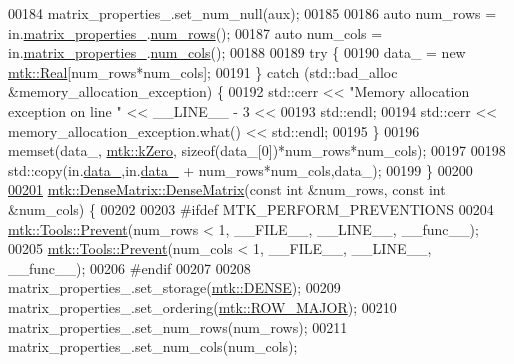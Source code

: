 \begin{DoxyCode}
00184   matrix\_properties\_.set\_num\_null(aux);
00185 
00186   \textcolor{keyword}{auto} num\_rows = in.\hyperlink{classmtk_1_1DenseMatrix_a481c8d09af685a5ba67acefdcaa810cc}{matrix\_properties\_}.\hyperlink{classmtk_1_1Matrix_ab308b25b48e4fcd39fc60e0c3fc66dea}{num\_rows}();
00187   \textcolor{keyword}{auto} num\_cols = in.\hyperlink{classmtk_1_1DenseMatrix_a481c8d09af685a5ba67acefdcaa810cc}{matrix\_properties\_}.\hyperlink{classmtk_1_1Matrix_a2160118d0edf51cf2aaa806ee1b915f8}{num\_cols}();
00188 
00189   \textcolor{keywordflow}{try} \{
00190     data\_ = \textcolor{keyword}{new} \hyperlink{group__c01-roots_gac080bbbf5cbb5502c9f00405f894857d}{mtk::Real}[num\_rows*num\_cols];
00191   \} \textcolor{keywordflow}{catch} (std::bad\_alloc &memory\_allocation\_exception) \{
00192     std::cerr << \textcolor{stringliteral}{"Memory allocation exception on line "} << \_\_LINE\_\_ - 3 <<
00193       std::endl;
00194     std::cerr << memory\_allocation\_exception.what() << std::endl;
00195   \}
00196   memset(data\_, \hyperlink{group__c01-roots_ga59a451a5fae30d59649bcda274fea271}{mtk::kZero}, \textcolor{keyword}{sizeof}(data\_[0])*num\_rows*num\_cols);
00197 
00198   std::copy(in.\hyperlink{classmtk_1_1DenseMatrix_a7893e4e5c8d2e2de32b156177e78cb6f}{data\_},in.\hyperlink{classmtk_1_1DenseMatrix_a7893e4e5c8d2e2de32b156177e78cb6f}{data\_} + num\_rows*num\_cols,data\_);
00199 \}
00200 
\hypertarget{mtk__dense__matrix_8cc_source_l00201}{}\hyperlink{classmtk_1_1DenseMatrix_abe26c623467fc1b293cf4f22a3a47cc8}{00201} \hyperlink{classmtk_1_1DenseMatrix_a0c75ee704707983f935b02835eab0933}{mtk::DenseMatrix::DenseMatrix}(\textcolor{keyword}{const} \textcolor{keywordtype}{int} &num\_rows, \textcolor{keyword}{const} \textcolor{keywordtype}{int} &num\_cols) \{
00202 
00203 \textcolor{preprocessor}{  #ifdef MTK\_PERFORM\_PREVENTIONS}
00204   \hyperlink{classmtk_1_1Tools_a332324c6f25e66be9dff48c5987a3b9f}{mtk::Tools::Prevent}(num\_rows < 1, \_\_FILE\_\_, \_\_LINE\_\_, \_\_func\_\_);
00205   \hyperlink{classmtk_1_1Tools_a332324c6f25e66be9dff48c5987a3b9f}{mtk::Tools::Prevent}(num\_cols < 1, \_\_FILE\_\_, \_\_LINE\_\_, \_\_func\_\_);
00206 \textcolor{preprocessor}{  #endif}
00207 
00208   matrix\_properties\_.set\_storage(\hyperlink{namespacemtk_ga25b67ec6a2afeee69f9bb196a9c66619a00a806d43a7d74e9ccca47a2134e9c87}{mtk::DENSE});
00209   matrix\_properties\_.set\_ordering(\hyperlink{namespacemtk_ga622801bd9f912d0f976c3e383f5f581cabc55178ac16eb1ce89b5f3ab915a91f3}{mtk::ROW\_MAJOR});
00210   matrix\_properties\_.set\_num\_rows(num\_rows);
00211   matrix\_properties\_.set\_num\_cols(num\_cols);

\end{DoxyCode}
